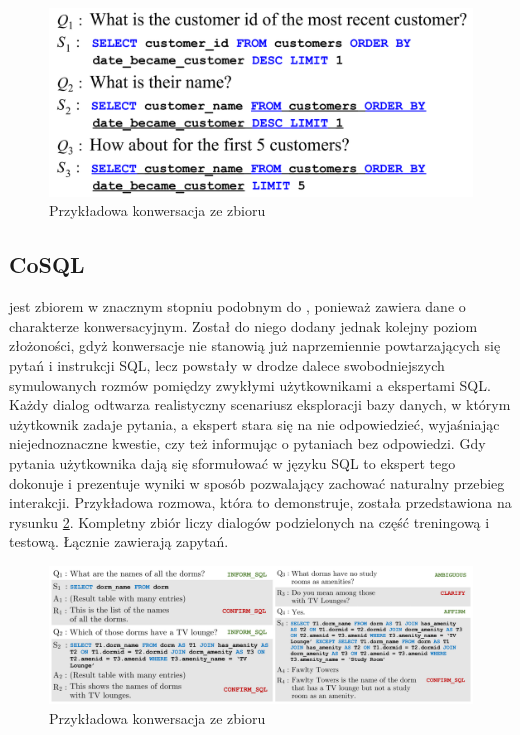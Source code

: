 \begin{figure}[ht!]
  \centering
  \includegraphics[width=0.6\linewidth]{images/sparc_example.png}
  \caption[Przykładowa konwersacja ze zbioru ]{Przykładowa konwersacja ze zbioru }
  \label{fig:sparc-example}
\end{figure}

\subsection{CoSQL}
  jest zbiorem w znacznym stopniu podobnym do , ponieważ zawiera dane o charakterze konwersacyjnym. Został do niego dodany jednak kolejny poziom złożoności, gdyż konwersacje nie stanowią już naprzemiennie powtarzających się pytań i instrukcji SQL, lecz powstały w drodze dalece swobodniejszych symulowanych rozmów pomiędzy zwykłymi użytkownikami a ekspertami SQL. Każdy dialog odtwarza realistyczny scenariusz eksploracji bazy danych, w którym użytkownik zadaje pytania, a ekspert stara się na nie odpowiedzieć, wyjaśniając niejednoznaczne kwestie, czy też informując o pytaniach bez odpowiedzi. Gdy pytania użytkownika dają się sformułować w języku SQL to ekspert tego dokonuje i prezentuje wyniki w sposób pozwalający zachować naturalny przebieg interakcji. Przykładowa rozmowa, która to demonstruje, została przedstawiona na rysunku \ref{fig:cosql-example}. Kompletny zbiór liczy  dialogów podzielonych na część treningową i testową. Łącznie zawierają  zapytań.

\begin{figure}[ht!]
  \centering
  \includegraphics[width=1.0\linewidth]{images/cosql_example.png}
  \caption[Przykładowa konwersacja ze zbioru ]{Przykładowa konwersacja ze zbioru }
  \label{fig:cosql-example}
\end{figure}

